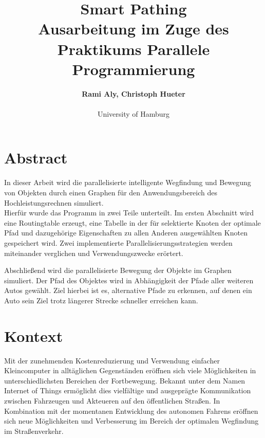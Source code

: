 \documentclass[paper=A4,pagesize=auto,12pt,headinclude=true,footinclude=true,BCOR=0mm,DIV=calc]{scrartcl}
\begin{document}
	
	\title{Smart Pathing\\
	\small{Ausarbeitung im Zuge des Praktikums Parallele Programmierung}}
	\author{\textbf{Rami Aly, Christoph Hueter}\\
	\\University of Hamburg}

	\maketitle
	
	\newpage
	
	\section{Abstract}
	In dieser Arbeit wird die parallelisierte intelligente Wegfindung und Bewegung von Objekten durch einen Graphen für den Anwendungsbereich des Hochleistungsrechnen simuliert.\\
	
	Hierfür wurde das Programm in zwei Teile unterteilt. Im ersten Abschnitt wird eine Routingtable erzeugt, eine Tabelle in der für selektierte Knoten der optimale Pfad und dazugehörige Eigenschaften zu allen Anderen ausgewählten Knoten gespeichert wird. Zwei implementierte Parallelisierungsstrategien werden miteinander verglichen und Verwendungszwecke erörtert.
	
	Abschließend wird die parallelisierte Bewegung der Objekte im Graphen simuliert. Der Pfad des Objektes wird in Abhängigkeit der Pfade aller weiteren Autos gewählt. Ziel hierbei ist es, alternative Pfade zu erkennen, auf denen ein Auto sein Ziel trotz längerer Strecke schneller erreichen kann.
	
	
	\newpage
	
	\tableofcontents 
	
	\newpage
	\section{Kontext}
	Mit der zunehmenden Kostenreduzierung und Verwendung einfacher Kleincomputer in alltäglichen Gegenständen eröffnen sich viele Möglichkeiten in unterschiedlichsten Bereichen der Fortbewegung. Bekannt unter dem Namen Internet of Things ermöglicht dies vielfältige und ausgeprägte Kommunikation zwischen Fahrzeugen und Akteueren auf den öffentlichen Straßen. In Kombination mit der momentanen Entwicklung des autonomen Fahrens eröffnen sich neue Möglichkeiten und Verbesserung im Bereich der optimalen Wegfindung im Straßenverkehr.
	
\end{document}
